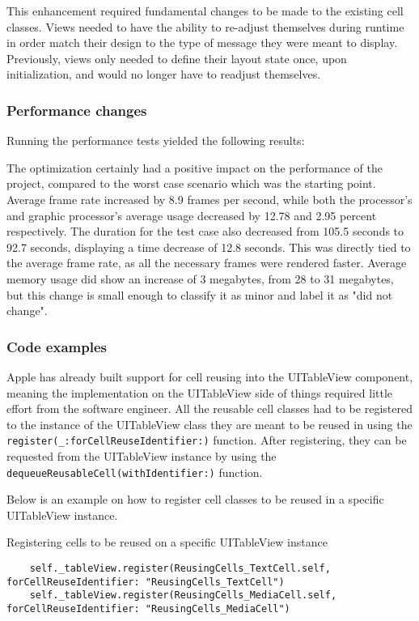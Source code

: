 \documentclass[a4paper,12pt]{article}
\begin{document}
This enhancement required fundamental changes to be made to the existing cell classes. Views needed to have the ability to re-adjust themselves during runtime in order match their design to the type of message they were meant to display. Previously, views only needed to define their layout state once, upon initialization, and would no longer have to readjust themselves.

\subsubsection{Performance changes}
Running the performance tests yielded the following results:

The optimization certainly had a positive impact on the performance of the project, compared to the worst case scenario which was the starting point. Average frame rate increased by 8.9 frames per second, while both the processor's and graphic processor's average usage decreased by 12.78 and 2.95 percent respectively. The duration for the test case also decreased from 105.5 seconds to 92.7 seconds, displaying a time decrease of 12.8 seconds. This was directly tied to the average frame rate, as all the necessary frames were rendered faster. Average memory usage did show an increase of 3 megabytes, from 28 to 31 megabytes, but this change is small enough to classify it as minor and label it as "did not change".

\subsubsection{Code examples}
Apple has already built support for cell reusing into the UITableView component, meaning the implementation on the UITableView side of things required little effort from the software engineer. All the reusable cell classes had to be registered to the instance of the UITableView class they are meant to be reused in using the \texttt{register(_:forCellReuseIdentifier:)} function.\cite{AppleRegisterMethod} After registering, they can be requested from the UITableView instance by using the \texttt{dequeueReusableCell(withIdentifier:)} function.\cite{AppleDequeueReusableCellMethod}

Below is an example on how to register cell classes to be reused in a specific UITableView instance.
\begin{listing}[H]
  \caption{Registering cells to be reused on a specific UITableView instance}
  \begin{verbatim}
    self._tableView.register(ReusingCells_TextCell.self, forCellReuseIdentifier: "ReusingCells_TextCell")
    self._tableView.register(ReusingCells_MediaCell.self, forCellReuseIdentifier: "ReusingCells_MediaCell")
  \end{verbatim}
\end{listing}
\end{document}
